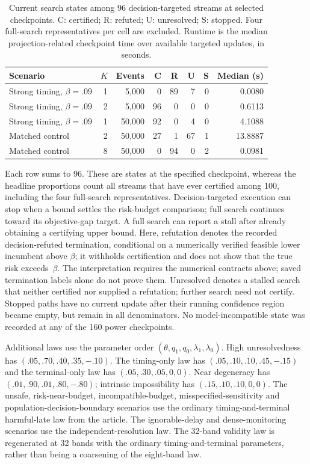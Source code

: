 \documentclass[10pt]{article}
\begin{document}
\Needspace{6.5in}

\begin{table}[!htbp]\centering\small
\caption{Current search states among 96 decision-targeted streams at selected checkpoints. C: certified; R: refuted; U: unresolved; S: stopped. Four full-search representatives per cell are excluded. Runtime is the median projection-related checkpoint time over available targeted updates, in seconds.}\label{tab:searchstates}
\begin{tabular}{lrrrrrrr}\toprule
Scenario & $K$ & Events & C & R & U & S & Median (s)\\\midrule
Strong timing, $\beta=.09$ & 1 & 5,000 & 0 & 89 & 7 & 0 & 0.0080\\
Strong timing, $\beta=.09$ & 2 & 5,000 & 96 & 0 & 0 & 0 & 0.6113\\
Strong timing, $\beta=.09$ & 1 & 50,000 & 92 & 0 & 4 & 0 & 4.1088\\
Matched control & 2 & 50,000 & 27 & 1 & 67 & 1 & 13.8887\\
Matched control & 8 & 50,000 & 0 & 94 & 0 & 2 & 0.0981\\
\bottomrule\end{tabular}
\end{table}

Each row sums to 96. These are states at the specified checkpoint, whereas the headline proportions count all streams that have ever certified among 100, including the four full-search representatives. Decision-targeted execution can stop when a bound settles the risk-budget comparison; full search continues toward its objective-gap target. A full search can report a stall after already obtaining a certifying upper bound. Here, refutation denotes the recorded decision-refuted termination, conditional on a numerically verified feasible lower incumbent above $\beta$; it withholds certification and does not show that the true risk exceeds~$\beta$. The interpretation requires the numerical contracts above; saved termination labels alone do not prove them. Unresolved denotes a stalled search that neither certified nor supplied a refutation; further search need not certify. Stopped paths have no current update after their running confidence region became empty, but remain in all denominators. No model-incompatible state was recorded at any of the 160 power checkpoints.

Additional laws use the parameter order $(\theta,q_1,q_0,\lambda_1,\lambda_0)$. High unresolvedness has $(.05,.70,.40,.35,-.10)$. The timing-only law has $(.05,.10,.10,.45,-.15)$ and the terminal-only law has $(.05,.30,.05,0,0)$. Near degeneracy has $(.01,.90,.01,.80,-.80)$; intrinsic impossibility has $(.15,.10,.10,0,0)$. The unsafe, risk-near-budget, incompatible-budget, misspecified-sensitivity and population-decision-boundary scenarios use the ordinary timing-and-terminal harmful-late law from the article. The ignorable-delay and dense-monitoring scenarios use the independent-resolution law. The 32-band validity law is regenerated at 32 bands with the ordinary timing-and-terminal parameters, rather than being a coarsening of the eight-band law.
\end{document}
